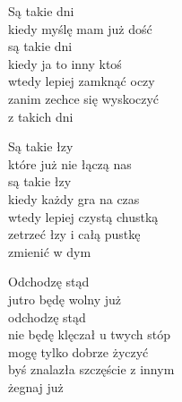 \begin{text}
    Są takie dni\\
    kiedy myślę mam już dość\\
    są takie dni\\
    kiedy ja to inny ktoś\\
    wtedy lepiej zamknąć oczy\\
    zanim zechce się wyskoczyć\\
    z takich dni

    Są takie łzy\\
    które już nie łączą nas\\
    są takie łzy\\
    kiedy każdy gra na czas\\
    wtedy lepiej czystą chustką\\
    zetrzeć łzy i całą pustkę\\
    zmienić w dym

    Odchodzę stąd\\
    jutro będę wolny już\\
    odchodzę stąd\\
    nie będę klęczał u twych stóp\\
    mogę tylko dobrze życzyć\\
    byś znalazła szczęście z innym\\
    żegnaj już
\end{text}
\begin{chord}

\end{chord}
